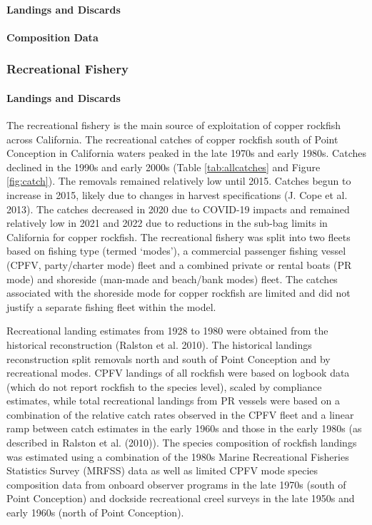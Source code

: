 \documentclass[11pt,
  english,
  letterpaper,
]{article}
\begin{document}
\hypertarget{landings-and-discards}{%
\paragraph{Landings and Discards}\label{landings-and-discards}}

\hypertarget{composition-data}{%
\paragraph{Composition Data}\label{composition-data}}

\hypertarget{recreational-fishery}{%
\subsubsection{Recreational Fishery}\label{recreational-fishery}}

\hypertarget{landings-and-discards-1}{%
\paragraph{Landings and Discards}\label{landings-and-discards-1}}

The recreational fishery is the main source of exploitation of copper rockfish across California. The recreational catches of copper rockfish south of Point Conception in California waters peaked in the late 1970s and early 1980s. Catches declined in the 1990s and early 2000s (Table \ref{tab:allcatches} and Figure \ref{fig:catch}). The removals remained relatively low until 2015. Catches begun to increase in 2015, likely due to changes in harvest specifications (J. Cope et al. 2013). The catches decreased in 2020 due to COVID-19 impacts and remained relatively low in 2021 and 2022 due to reductions in the sub-bag limits in California for copper rockfish. The recreational fishery was split into two fleets based on fishing type (termed `modes'), a commercial passenger fishing vessel (CPFV, party/charter mode) fleet and a combined private or rental boats (PR mode) and shoreside (man-made and beach/bank modes) fleet. The catches associated with the shoreside mode for copper rockfish are limited and did not justify a separate fishing fleet within the model.

Recreational landing estimates from 1928 to 1980 were obtained from the historical reconstruction (Ralston et al. 2010). The historical landings reconstruction split removals north and south of Point Conception and by recreational modes. CPFV landings of all rockfish were based on logbook data (which do not report rockfish to the species level), scaled by compliance estimates, while total recreational landings from PR vessels were based on a combination of the relative catch rates observed in the CPFV fleet and a linear ramp between catch estimates in the early 1960s and those in the early 1980s (as described in Ralston et al. (2010)). The species composition of rockfish landings was estimated using a combination of the 1980s Marine Recreational Fisheries Statistics Survey (MRFSS) data as well as limited CPFV mode species composition data from onboard observer programs in the late 1970s (south of Point Conception) and dockside recreational creel surveys in the late 1950s and early 1960s (north of Point Conception).
\end{document}

